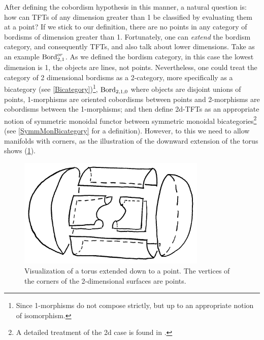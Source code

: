 \begin{rem}\label{RemarkExtendedTFTs}
    After defining the cobordism hypothesis in this manner, a natural question is: how can TFTs of any dimension greater than 1 be classified by evaluating them at a point? If we stick to our definition, there are no points in any category of bordisms of dimension greater than 1. Fortunately, one can \emph{extend} the bordism category, and consequently TFTs, and also talk about lower dimensions. Take as an example $\operatorname{Bord}^{or}_{2,1}$. As we defined the bordism category, in this case the lowest dimension is 1, the objects are lines, not points. Nevertheless, one could treat the category of 2 dimensional bordisms as a 2-category, more specifically as a bicategory (see \ref{Bicategory})\footnote{Since 1-morphisms do not compose strictly, but up to an appropriate notion of isomorphism.}, $\operatorname{Bord}_{2,1,0}$ where objects are disjoint unions of points, 1-morphisms are oriented cobordisms between points and 2-morphisms are cobordisms between the 1-morphisms; and then define 2d-TFTs as an
     appropriate notion of symmetric monoidal functor between symmetric monoidal bicategories\footnote{A detailed
         treatment of the 2d case is found in \cite{schommerpries2014classification}.} (see \ref{SymmMonBicategory} for a definition).  
         However, to this we need to allow manifolds with corners, as the illustration of the downward extension of the torus shows (\ref{CUTTORUS}).
    \begin{figure}
        \centering
        \captionsetup{format = hang}
        \includegraphics[width=9cm]{images/Final Lecture/TorusExtendedCut.png} 
        \caption{\small{Visualization of a torus extended down to a point. The vertices of the corners of the 2-dimensional surfaces are points.}}
        \label{CUTTORUS}
    \end{figure}
    

\end{rem}
